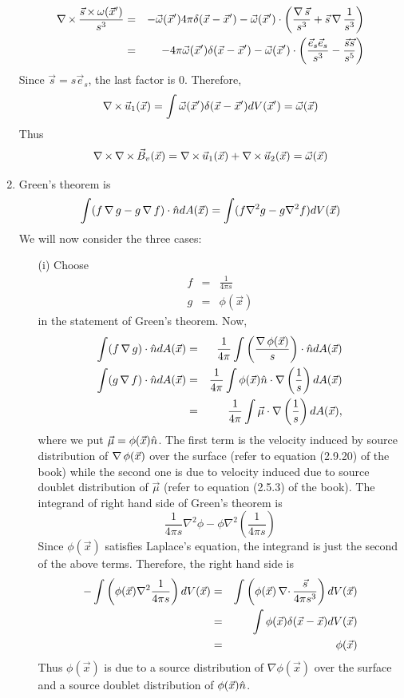 \begin{enumerate}
\begin{eqnarray*}
\operatorname{\nabla\operatorname{\times}}\frac{\vec{s}\operatorname{\times}\omega(\vec{x}^{\prime})}{s^3} &=& -\vec{\omega}(\vec{x}^{\prime})4\pi\delta(\vec{x}-\vec{x}^{\prime}) - 
 \vec{\omega}(\vec{x}^{\prime})\cdot\left(\frac{\operatorname{\nabla}\vec{s}}{s^3}+\vec{s}\operatorname{\nabla}\frac{1}{s^3}\right)	\\
 &=& -4\pi\vec{\omega}(\vec{x}^{\prime})\delta(\vec{x}-\vec{x}^{\prime})-\vec{\omega}(\vec{x}^{\prime})\cdot\left(\frac{\vec{e}_s\vec{e}_s}{s^3}-\frac{\vec{s}\vec{s}}{s^5}\right)
\end{eqnarray*}
Since $\vec{s}=s\vec{e}_s$, the last factor is $0$. Therefore,
\[
\operatorname{\nabla\operatorname{\times}}\vec{u}_1(\vec{x}) = \int\vec{\omega}(\vec{x}^{\prime})\delta(\vec{x}-\vec{x}^{\prime})dV(\vec{x}^{\prime}) = \vec{\omega}(\vec{x})
\]
Thus
\[
\operatorname{\nabla\operatorname{\times}}\operatorname{\nabla\operatorname{\times}}\vec{B}_v(\vec{x}) = \operatorname{\nabla\operatorname{\times}}\vec{u}_1(\vec{x}) + \operatorname{\nabla\operatorname{\times}}\vec{u}_2(\vec{x}) = \vec{\omega}(\vec{x})
\]

\item Green's theorem is
\[
\int(f \operatorname{\nabla} g - g \operatorname{\nabla} f)\cdot\hat{n} dA(\vec{x}) = \int(f\nabla^2g - g\nabla^2f)dV(\vec{x})
\]
We will now consider the three cases:
\begin{itemize}
\item[(i)] Choose
\begin{eqnarray*}
f &=& \frac{1}{4\pi s} \\
g &=& \phi(\vec{x})
\end{eqnarray*}
in the statement of Green's theorem.
Now,
\begin{eqnarray*}
\int(f \operatorname{\nabla} g)\cdot\hat{n} dA(\vec{x}) &=& \frac{1}{4\pi}\int\left(\frac{\operatorname{\nabla}\phi(\vec{x})}{s}\right)\cdot\hat{n} dA(\vec{x})	\\
\int(g \operatorname{\nabla} f)\cdot\hat{n} dA(\vec{x}) &=& \frac{1}{4\pi}\int\phi(\vec{x})\hat{n}\cdot\operatorname{\nabla}\left(\frac{1}{s}\right)dA(\vec{x}) \\
 &=& \frac{1}{4\pi}\int\vec{\mu}\cdot\operatorname{\nabla}\left(\frac{1}{s}\right)dA(\vec{x}),
\end{eqnarray*}
where we put $\vec{\mu} = \phi(\vec{x})\hat{n}$. The first term is the velocity induced by source distribution of $\operatorname{\nabla}\phi(\vec{x})$ over the surface (refer to equation 
(2.9.20) of the book) while the second one is due to velocity induced due to source doublet distribution of $\vec{\mu}$ (refer to equation (2.5.3) of the book).
The integrand of right hand side of Green's theorem is
\[
\frac{1}{4\pi s}\nabla^2\phi - \phi\nabla^2\left(\frac{1}{4\pi s}\right)
\]
Since $\phi(\vec{x})$ satisfies Laplace's equation, the integrand is just the second of the above terms. Therefore, the right hand side is
\begin{eqnarray*}
-\int\left(\phi(\vec{x}){\nabla}^2\frac{1}{4\pi s}\right)dV(\vec{x}) &=& \int\left(\phi(\vec{x})\operatorname{\nabla\cdot}\frac{\vec{s}}{4\pi s^3}\right)dV(\vec{x}) \\
 &=& \int\phi(\vec{x})\delta(\vec{x}-\vec{x})dV(\vec{x})	\\
 &=& \phi(\vec{x})
\end{eqnarray*}
Thus $\phi(\vec{x})$ is due to a source distribution of $\nabla\phi(\vec{x})$ over the surface and a source doublet distribution of $\phi(\vec{x})\hat{n}$.


\end{itemize}
\end{enumerate}
